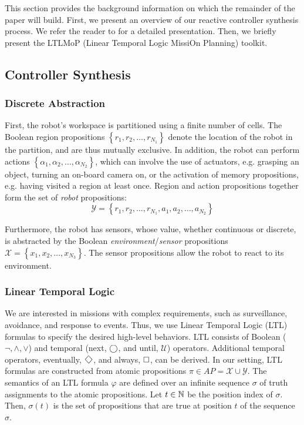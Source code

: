 This section provides the background information on which the remainder of the paper will build. First, we present an overview of our reactive controller synthesis process. We refer the reader to \cite{KGFP_TRO09} for a detailed presentation. Then, we briefly present the LTLMoP (Linear Temporal Logic MissiOn Planning) toolkit.

\subsection{Controller Synthesis}\label{preliminariesA}

\subsubsection*{Discrete Abstraction}\label{discreteAbs}

First, the robot's workspace is partitioned using a finite number of cells. The Boolean region propositions $\left\{r_1, r_2, \ldots, r_{N_1} \right\}$ denote the location of the robot in the partition, and are thus mutually exclusive. In addition, the robot can perform actions $\left\{\alpha_1, \alpha_2, \ldots, \alpha_{N_2} \right\}$, which can involve the use of actuators, e.g. grasping an object, turning an on-board camera on, or the activation of memory propositions, e.g. having visited a region at least once. Region and action propositions together form the set of \emph{robot} propositions:
 \begin{equation*}
 	\mathcal{Y} = \left\{ r_1, r_2, \ldots, r_{N_1}, a_1, a_2, \ldots, a_{N_2} \right\}
 \end{equation*}

Furthermore, the robot has sensors, whose value, whether continuous or discrete, is abstracted by the Boolean \emph{environment}/\emph{sensor} propositions $\mathcal{X} = \left\{ x_1, x_2, \ldots, x_{N_3} \right\}$. 
The sensor propositions allow the robot to react to its environment. 

\subsubsection*{Linear Temporal Logic}\label{LTL}

We are interested in missions with complex requirements, such as surveillance, avoidance, and response to events. 
Thus, we use Linear Temporal Logic (LTL) formulas to specify the desired high-level behaviors. LTL consists of Boolean ($\neg, \wedge, \lor$) and temporal (next, $\operatorname{\bigcirc}$, and until, $\mathcal{U}$) operators. 
Additional temporal operators, eventually, $\F$, and always, $\operatorname{\Box}$, can be derived. 
In our setting, LTL formulas are constructed from atomic propositions $\pi \in AP = \mathcal{X} \cup \mathcal{Y}$. 
The semantics of an LTL formula $\varphi$ are defined over an infinite sequence $\sigma$ of truth assignments to the atomic propositions. 
Let $t \in \mathbb{N}$ be the position index of $\sigma$. Then, $\sigma (t)$ is the set of propositions that are true at position $t$ of the sequence $\sigma$. 

